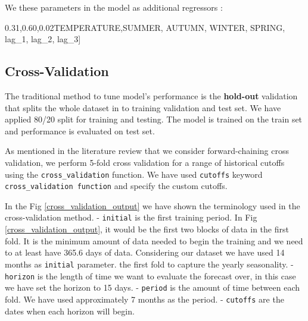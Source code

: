 \documentclass[mstat,12pt]{unswthesis}
\newenvironment{Shaded}{\begin{snugshade}}{\end{snugshade}}
\newcommand{\NormalTok}[1]{#1}
\newcommand{\StringTok}[1]{\textcolor[rgb]{0.31,0.60,0.02}{#1}}
\begin{document}
We these parameters in the model as additional regressors :

\begin{Shaded}
\begin{Highlighting}[]
\NormalTok{[}\StringTok{\textquotesingle{}TEMPERATURE\textquotesingle{}}\NormalTok{,}\StringTok{\textquotesingle{}SUMMER\textquotesingle{}}\NormalTok{, }\StringTok{\textquotesingle{}AUTUMN\textquotesingle{}}\NormalTok{, }\StringTok{\textquotesingle{}WINTER\textquotesingle{}}\NormalTok{, }\StringTok{\textquotesingle{}SPRING\textquotesingle{}}\NormalTok{, }
        \StringTok{\textquotesingle{}lag\_1\textquotesingle{}}\NormalTok{, }\StringTok{\textquotesingle{}lag\_2\textquotesingle{}}\NormalTok{, }\StringTok{\textquotesingle{}lag\_3\textquotesingle{}}\NormalTok{]}
\end{Highlighting}
\end{Shaded}

\subsection{Cross-Validation}\label{cross-validation}

The traditional method to tune model's performance is the
\textbf{hold-out} validation that splits the whole dataset in to
training validation and test set. We have applied 80/20 split for
training and testing. The model is trained on the train set and
performance is evaluated on test set.

As mentioned in the literature review that we consider forward-chaining
cross validation, we perform 5-fold cross validation for a range of
historical cutoffs using the \texttt{cross\_validation} function. We
have used \texttt{cutoffs} keyword \texttt{cross\_validation\ function}
and specify the custom cutoffs.

In the Fig \ref{cross_validation_output} we have shown the terminology
used in the cross-validation method. - \texttt{initial} is the first
training period. In Fig \ref{cross_validation_output}, it would be the
first two blocks of data in the first fold. It is the minimum amount of
data needed to begin the training and we need to at least have 365.6
days of data. Considering our dataset we have used 14 months as
\texttt{initial} parameter. the first fold to capture the yearly
seasonality. - \texttt{horizon} is the length of time we want to
evaluate the forecast over, in this case we have set the horizon to 15
days. - \texttt{period} is the amount of time between each fold. We have
used approximately 7 months as the period. - \texttt{cutoffs} are the
dates when each horizon will begin.
\end{document}
